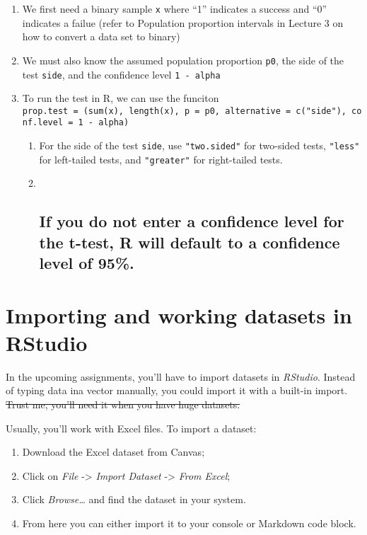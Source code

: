 \begin{enumerate}
\def\labelenumi{\arabic{enumi}.}
\item
  We first need a binary sample \texttt{x} where ``1'' indicates a
  success and ``0'' indicates a failue (refer to Population proportion
  intervals in Lecture 3 on how to convert a data set to binary)
\item
  We must also know the assumed population proportion \texttt{p0}, the
  side of the test \texttt{side}, and the confidence level
  \texttt{1\ -\ alpha}
\item
  To run the test in R, we can use the funciton
  \texttt{prop.test\ =\ (sum(x),\ length(x),\ p\ =\ p0,\ alternative\ =\ c("side"),\ conf.level\ =\ 1\ -\ alpha)}

  \begin{enumerate}
  \def\labelenumii{\alph{enumii}.}
  \item
    For the side of the test \texttt{side}, use \texttt{"two.sided"} for
    two-sided tests, \texttt{"less"} for left-tailed tests, and
    \texttt{"greater"} for right-tailed tests.
  \item ~
    \hypertarget{if-you-do-not-enter-a-confidence-level-for-the-t-test-r-will-default-to-a-confidence-level-of-95.}{%
    \subsection{If you do not enter a confidence level for the t-test, R
    will default to a confidence level of
    95\%.}\label{if-you-do-not-enter-a-confidence-level-for-the-t-test-r-will-default-to-a-confidence-level-of-95.}}
  \end{enumerate}
\end{enumerate}

\hypertarget{importing-and-working-datasets-in-rstudio}{%
\section{Importing and working datasets in
RStudio}\label{importing-and-working-datasets-in-rstudio}}

In the upcoming assignments, you'll have to import datasets in
\emph{RStudio}. Instead of typing data ina vector manually, you could
import it with a built-in import. \st{Trust me, you'll need it when you
have huge datasets.}

Usually, you'll work with Excel files. To import a dataset:

\begin{enumerate}
\def\labelenumi{\arabic{enumi}.}
\tightlist
\item
  Download the Excel dataset from Canvas;
\item
  Click on \emph{File} -\textgreater{} \emph{Import Dataset}
  -\textgreater{} \emph{From Excel};
\item
  Click \emph{Browse\ldots{}} and find the dataset in your system.
\item
  From here you can either import it to your console or Markdown code
  block.
\end{enumerate}

